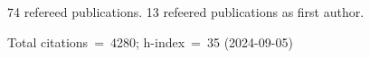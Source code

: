 74 refereed publications. 13 refeered publications as first author.

Total citations~=~4280; h-index~=~35 (2024-09-05)